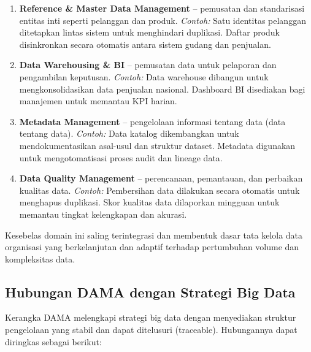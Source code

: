 \begin{enumerate}
	\item \textbf{Reference \& Master Data Management} – pemusatan dan standarisasi entitas inti seperti pelanggan dan produk. \textit{Contoh:}  Satu identitas pelanggan ditetapkan lintas sistem untuk menghindari duplikasi. Daftar produk disinkronkan secara otomatis antara sistem gudang dan penjualan.
	
	\item \textbf{Data Warehousing \& BI} – pemusatan data untuk pelaporan dan pengambilan keputusan. \textit{Contoh:}  Data warehouse dibangun untuk mengkonsolidasikan data penjualan nasional. Dashboard BI disediakan bagi manajemen untuk memantau KPI harian.
	
	\item \textbf{Metadata Management} – pengelolaan informasi tentang data (data tentang data). \textit{Contoh:}  Data katalog dikembangkan untuk mendokumentasikan asal-usul dan struktur dataset. Metadata digunakan untuk mengotomatisasi proses audit dan lineage data.
	
	\item \textbf{Data Quality Management} – perencanaan, pemantauan, dan perbaikan kualitas data. \textit{Contoh:}  Pembersihan data dilakukan secara otomatis untuk menghapus duplikasi. Skor kualitas data dilaporkan mingguan untuk memantau tingkat kelengkapan dan akurasi.
\end{enumerate}


Kesebelas domain ini saling terintegrasi dan membentuk dasar tata kelola data organisasi yang berkelanjutan dan adaptif terhadap pertumbuhan volume dan kompleksitas data.

\subsection{Hubungan DAMA dengan Strategi Big Data}

Kerangka DAMA melengkapi strategi big data dengan menyediakan struktur pengelolaan yang stabil dan dapat ditelusuri (traceable). Hubungannya dapat diringkas sebagai berikut:

